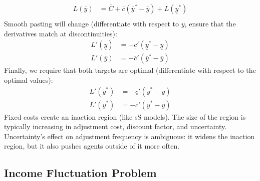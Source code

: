 \documentclass[12pt]{article}
\begin{document}
\begin{itemize}
\[\begin{split}
        L(\overline{y}) &= \overline{C} + \overline{c}(\overline{y}^* - \overline{y}) + L(\underline{y}^*) \\
    \end{split}\]
    Smooth pasting will change (differentiate with respect to $y$, ensure that the derivatives match at discontinuities):
    \[\begin{split}
        L'(\underline{y}) &= -\underline{c}'(\underline{y}^* - \underline{y}) \\
        L'(\overline{y}) &= -\overline{c}'(\overline{y}^* - \overline{y})
    \end{split}\]
    Finally, we require that both targets are optimal (differentiate with respect to the optimal values):
    \[\begin{split}
        L'(\underline{y}^*) &= -\underline{c}'(\underline{y}^* - \underline{y}) \\
        L'(\overline{y}^*) &= -\overline{c}'(\overline{y}^* - \overline{y})
    \end{split}\]
    Fixed costs create an inaction region (like sS models). The size of the region is typically increasing in adjustment cost, discount factor, and uncertainty. Uncertainty's effect on adjustment frequency is ambiguous: it widens the inaction region, but it also pushes agents outside of it more often.
\end{itemize}

\subsection{Income Fluctuation Problem}
\end{document}
